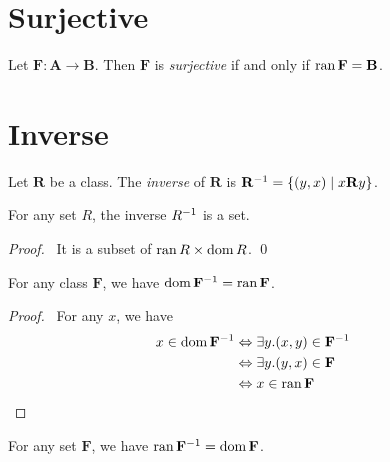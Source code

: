 \section{Surjective}

\begin{definition}
    Let $\mathbf{F} : \mathbf{A} \rightarrow \mathbf{B}$. Then $\mathbf{F}$ is \emph{surjective} if and only if
    $\operatorname{ran} \mathbf{F} = \mathbf{B}$.
\end{definition}

\section{Inverse}

\begin{definition}
    Let $\mathbf{R}$ be a class. The \emph{inverse} of $\mathbf{R}$ is 
    ${\mathbf{R}}^{-1} = \{ (y,x) \mid x \mathbf{R} y \}$.
\end{definition}

\begin{theorem}
    For any set $R$, the inverse ${R}^{-1}$ is a set.
\end{theorem}

\begin{proof}
    \pf\ It is a subset of $\operatorname{ran} R \times \operatorname{dom} R$. \qed
\end{proof}

\begin{theorem}[Pairing]
    \label{theorem:dom_inv}
    For any class $\mathbf{F}$, we have $\operatorname{dom} {\mathbf{F}}^{-1} = \operatorname{ran} \mathbf{F}$.
\end{theorem}

\begin{proof}
    \pf\ For any $x$, we have
    \begin{align*}
        x \in \operatorname{dom} {\mathbf{F}}^{-1} & \Leftrightarrow \exists y. (x,y) \in {\mathbf{F}}^{-1} \\
        & \Leftrightarrow \exists y. (y,x) \in \mathbf{F} \\
        & \Leftrightarrow x \in \operatorname{ran} \mathbf{F} & \relax
    \end{align*}
\end{proof}

\begin{theorem}[Pairing]
    \label{theorem:ran_inv}
    For any set $\mathbf{F}$, we have $\operatorname{ran} {\mathbf{F}}^{-1} = \operatorname{dom} \mathbf{F}$.
\end{theorem}

